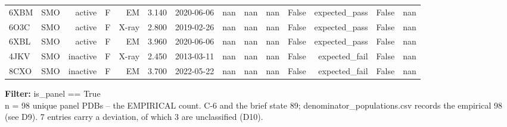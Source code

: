\begin{longtable}{lrrrrrrrrrrrrr}
6XBM & SMO & active & F & EM & 3.140 & 2020-06-06 & nan & nan & nan & False & expected\_pass & False & nan \\
6O3C & SMO & active & F & X-ray & 2.800 & 2019-02-26 & nan & nan & nan & False & expected\_pass & False & nan \\
6XBL & SMO & active & F & EM & 3.960 & 2020-06-06 & nan & nan & nan & False & expected\_pass & False & nan \\
4JKV & SMO & inactive & F & X-ray & 2.450 & 2013-03-11 & nan & nan & nan & False & expected\_fail & False & nan \\
8CXO & SMO & inactive & F & EM & 3.700 & 2022-05-22 & nan & nan & nan & False & expected\_fail & False & nan \\
\end{longtable}
\begin{flushleft}\scriptsize
\textbf{Filter:} is\_panel == True
 \\ n = 98 unique panel PDBs -- the EMPIRICAL count. C-6 and the brief state 89; denominator\_populations.csv records the empirical 98 (see D9). 7 entries carry a deviation, of which 3 are unclassified (D10).
\end{flushleft}
\endgroup
